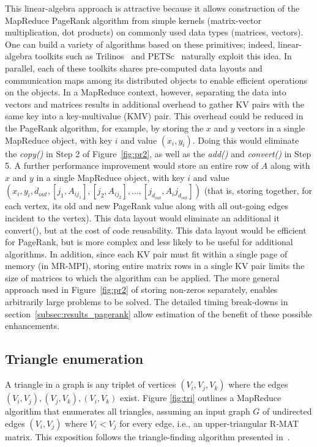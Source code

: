 This linear-algebra approach is attractive because it allows
construction of the MapReduce PageRank algorithm from simple kernels
(matrix-vector multiplication, dot products) on commonly used data
types (matrices, vectors).  One can build a variety of algorithms
based on these primitives; indeed, linear-algebra toolkits such as
Trilinos~\cite{Trilinos-Overview} and PETSc~\cite{petsc-efficient}
naturally exploit this idea.  In parallel, each of these toolkits shares
pre-computed data layouts and communication maps among its distributed
objects to enable efficient operations on the objects.  In a MapReduce
context, however, separating the data into vectors and matrices
results in additional overhead to gather KV pairs with the same key
into a key-multivalue (KMV) pair.  This overhead could be reduced in
the PageRank algorithm, for example, by storing the $x$ and $y$
vectors in a single MapReduce object, with key $i$ and value $(x_i,
y_i)$.  Doing this would eliminate the {\it copy()} in Step 2 of
Figure~\ref{fig:pr2}, as well as the {\it add()} and {\it convert()}
in Step 5.  A further performance improvement would store an entire
row of $A$ along with $x$ and $y$ in a single MapReduce object, with
key $i$ and value $(x_i, y_i, d_{out}, [j_1, A_{ij_1}], [j_2,
A_{ij_2}], \dots, [j_{d_{out}}, A_ij_{d_{out}}])$ (that is, storing
together, for each vertex, its old and new PageRank value along with
all out-going edges incident to the vertex).  This data layout would
eliminate an additional {it convert()}, but at the cost of code
reusability.  This data layout would be efficient for PageRank, but is
more complex and less likely to be useful for additional algorithms.
In addition, since each KV pair must fit within a single page of
memory (in MR-MPI), storing entire matrix rows in a single KV pair
limits the size of matrices to which the algorithm can be applied.
The more general approach used in Figure~\ref{fig:pr2} of storing
non-zeros separately, enables arbitrarily large problems to be solved.
The detailed timing break-downs in
section~\ref{subsec:results_pagerank} allow estimation of the benefit
of these possible enhancements.

\subsection{Triangle enumeration}

A triangle in a graph is any triplet of vertices $(V_i,V_j,V_k)$ where
the edges $(V_i,V_j), (V_j,V_k), (V_i,V_k)$ exist.  Figure
\ref{fig:tri} outlines a MapReduce algorithm that enumerates all
triangles, assuming an input graph $G$ of undirected edges $(V_i,V_j)$
where $V_i < V_j$ for every edge, i.e., an upper-triangular R-MAT
matrix.  This exposition follows the triangle-finding algorithm
presented in~\cite{Cohen09}.

